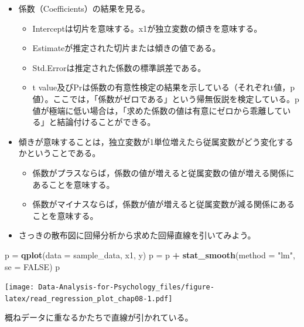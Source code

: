 \documentclass[]{article}
\newenvironment{Shaded}{\begin{snugshade}}{\end{snugshade}}
\newcommand{\KeywordTok}[1]{\textcolor[rgb]{0.13,0.29,0.53}{\textbf{#1}}}
\newcommand{\DataTypeTok}[1]{\textcolor[rgb]{0.13,0.29,0.53}{#1}}
\newcommand{\StringTok}[1]{\textcolor[rgb]{0.31,0.60,0.02}{#1}}
\newcommand{\OtherTok}[1]{\textcolor[rgb]{0.56,0.35,0.01}{#1}}
\newcommand{\OperatorTok}[1]{\textcolor[rgb]{0.81,0.36,0.00}{\textbf{#1}}}
\newcommand{\NormalTok}[1]{#1}
\providecommand{\tightlist}{%
  \setlength{\itemsep}{0pt}\setlength{\parskip}{0pt}}
\begin{document}
\begin{itemize}
\tightlist
\item
  係数（Coefficients）の結果を見る。

  \begin{itemize}
  \tightlist
  \item
    Interceptは切片を意味する。x1が独立変数の傾きを意味する。\\
  \item
    Estimateが推定された切片または傾きの値である。\\
  \item
    Std.Errorは推定された係数の標準誤差である。\\
  \item
    t
    value及びPrは係数の有意性検定の結果を示している（それぞれt値，p値）。ここでは，「係数がゼロである」という帰無仮説を検定している。p値が極端に低い場合は，「求めた係数の値は有意にゼロから乖離している」と結論付けることができる。
  \end{itemize}
\item
  傾きが意味することは，独立変数が1単位増えたら従属変数がどう変化するかということである。

  \begin{itemize}
  \tightlist
  \item
    係数がプラスならば，係数の値が増えると従属変数の値が増える関係にあることを意味する。
  \item
    係数がマイナスならば，係数が値が増えると従属変数が減る関係にあることを意味する。
  \end{itemize}
\item
  さっきの散布図に回帰分析から求めた回帰直線を引いてみよう。
\end{itemize}

\begin{Shaded}
\begin{Highlighting}[]
\NormalTok{p =}\StringTok{ }\KeywordTok{qplot}\NormalTok{(}\DataTypeTok{data =}\NormalTok{ sample_data, x1, y)}
\NormalTok{p =}\StringTok{ }\NormalTok{p }\OperatorTok{+}\StringTok{ }\KeywordTok{stat_smooth}\NormalTok{(}\DataTypeTok{method =} \StringTok{"lm"}\NormalTok{, }\DataTypeTok{se =} \OtherTok{FALSE}\NormalTok{)}
\NormalTok{p}
\end{Highlighting}
\end{Shaded}

\texttt{[image: Data-Analysis-for-Psychology\_files/figure-latex/read\_regression\_plot\_chap08-1.pdf]}

概ねデータに重なるかたちで直線が引かれている。
\end{document}
